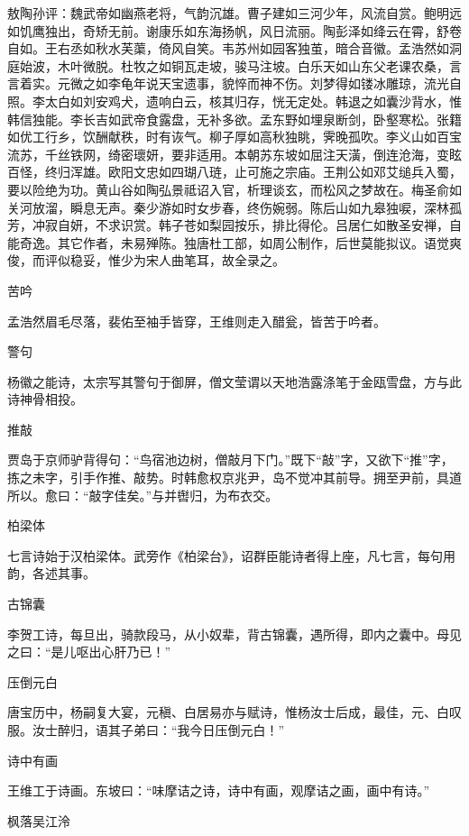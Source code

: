 \documentclass[a4paper,12pt,UTF8,twoside]{ctexbook}
\begin{document}
    敖陶孙评：魏武帝如幽燕老将，气韵沉雄。曹子建如三河少年，风流自赏。鲍明远如饥鹰独出，奇矫无前。谢康乐如东海扬帆，风日流丽。陶彭泽如绛云在霄，舒卷自如。王右丞如秋水芙蕖，倚风自笑。韦苏州如园客独茧，暗合音徽。孟浩然如洞庭始波，木叶微脱。杜牧之如铜瓦走坡，骏马注坡。白乐天如山东父老课农桑，言言着实。元微之如李龟年说天宝遗事，貌悴而神不伤。刘梦得如镂冰雕琼，流光自照。李太白如刘安鸡犬，遗响白云，核其归存，恍无定处。韩退之如囊沙背水，惟韩信独能。李长吉如武帝食露盘，无补多欲。孟东野如埋泉断剑，卧壑寒松。张籍如优工行乡，饮酬献秩，时有诙气。柳子厚如高秋独眺，霁晚孤吹。李义山如百宝流苏，千丝铁网，绮密瓌妍，要非适用。本朝苏东坡如屈注天潢，倒连沧海，变眩百怪，终归浑雄。欧阳文忠如四瑚八琏，止可施之宗庙。王荆公如邓艾缒兵入蜀，要以险绝为功。黄山谷如陶弘景祗诏入官，析理谈玄，而松风之梦故在。梅圣俞如关河放溜，瞬息无声。秦少游如时女步春，终伤婉弱。陈后山如九皋独唳，深林孤芳，冲寂自妍，不求识赏。韩子苍如梨园按乐，排比得伦。吕居仁如散圣安禅，自能奇逸。其它作者，未易殚陈。独唐杜工部，如周公制作，后世莫能拟议。语觉爽俊，而评似稳妥，惟少为宋人曲笔耳，故全录之。
    
    苦吟
    
    孟浩然眉毛尽落，裴佑至袖手皆穿，王维则走入醋瓮，皆苦于吟者。
    
    警句
    
    杨徽之能诗，太宗写其警句于御屏，僧文莹谓以天地浩露涤笔于金瓯雪盘，方与此诗神骨相投。
    
    推敲
    
    贾岛于京师驴背得句：“鸟宿池边树，僧敲月下门。”既下“敲”字，又欲下“推”字，拣之未字，引手作推、敲势。时韩愈权京兆尹，岛不觉冲其前导。拥至尹前，具道所以。愈曰：“敲字佳矣。”与并辔归，为布衣交。
    
    柏梁体
    
    七言诗始于汉柏梁体。武旁作《柏梁台》，诏群臣能诗者得上座，凡七言，每句用韵，各述其事。
    
    古锦囊
    
    李贺工诗，每旦出，骑款段马，从小奴辈，背古锦囊，遇所得，即内之囊中。母见之曰：“是儿呕出心肝乃已！”
    
    压倒元白
    
    唐宝历中，杨嗣复大宴，元稹、白居易亦与赋诗，惟杨汝士后成，最佳，元、白叹服。汝士醉归，语其子弟曰：“我今日压倒元白！”
    
    诗中有画
    
    王维工于诗画。东坡曰：“味摩诘之诗，诗中有画，观摩诘之画，画中有诗。”
    
    枫落吴江泠
    
\end{document}

